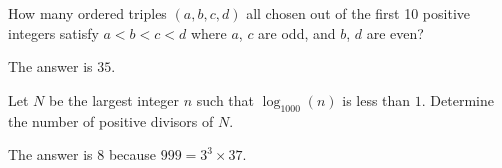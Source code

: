 \begin{problem}
How many ordered triples $(a,b,c,d)$ all chosen out of the first 10 positive integers satisfy $a<b<c<d$ where $a$, $c$ are odd, and $b$, $d$ are even?
\end{problem}

\begin{solution}
The answer is $35$.
\end{solution}

\begin{problem}
Let $N$ be the largest integer $n$ such that $\log_{1000}(n)$ is less than $1$. Determine the number of positive divisors of $N$.
\end{problem}

\begin{solution}
The answer is $8$ because $999=3^3\times37$.
\end{solution}